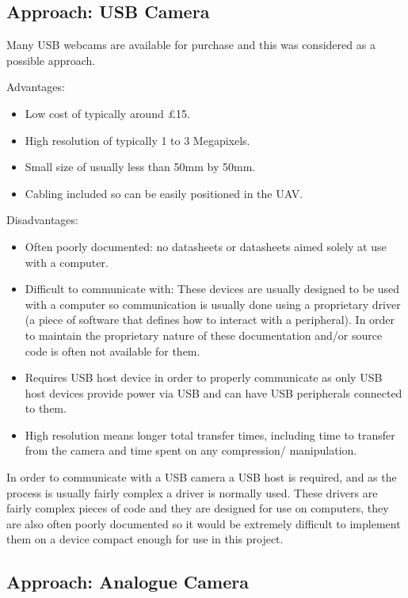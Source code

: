 \subsection{Approach: USB Camera}
\label{sec:USB_option}
Many USB webcams are available for purchase and this was considered as a possible approach.

Advantages:
      \begin{itemize}
         \item Low cost of typically around \pounds 15.
         \item High resolution of typically 1 to 3 Megapixels.
		 \item Small size of usually less than 50mm by 50mm.
		 \item Cabling included so can be easily positioned in the UAV.
     \end{itemize}

Disadvantages:
\begin{itemize}
     \item Often poorly documented: no datasheets or datasheets aimed solely at use with a computer.
     \item Difficult to communicate with: These devices are usually designed to be used with a computer so communication is usually done using a proprietary driver (a piece of software that defines how to interact with a peripheral). In order to maintain the proprietary nature of these documentation and/or source code is often not available for them.
    \item Requires USB host device in order to properly communicate as only USB host devices provide power via USB and can have USB peripherals connected to them.
	\item High resolution means longer total transfer times, including time to transfer from the camera and time spent on any compression/ manipulation.
\end{itemize}

In order to communicate with a USB camera a USB host is required, and as the process is usually fairly complex a driver is normally used. These drivers are fairly complex pieces of code and they are designed for use on computers, they are also often poorly documented so it would be extremely difficult to implement them on a device compact enough for use in this project.

\subsection{Approach: Analogue Camera}
\label{sec:Analog_option}

